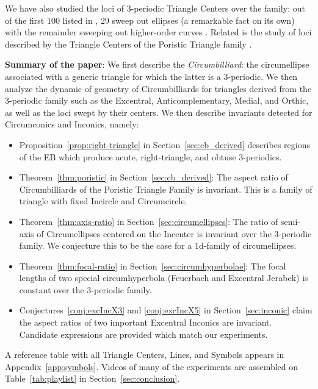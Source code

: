 We have also studied the loci of 3-periodic Triangle Centers over the family: out of the first 100 listed in \cite{etc}, 29 sweep out ellipses (a remarkable fact on its own) with the remainder sweeping out higher-order curves \cite{garcia2020-ellipses}. Related is the study of  loci described by the Triangle Centers of the Poristic Triangle family \cite{odehnal2011-poristic}.

\textbf{Summary of the paper}: We first describe the {\em Circumbilliard}: the circumellipse associated with a generic triangle for which the latter is a 3-periodic. We then analyze the dynamic of geometry of Circumbilliards for triangles derived from the 3-periodic family such as the Excentral, Anticomplementary, Medial, and Orthic, as well as the loci swept by their centers. We then describe invariants detected for Circumconics and Inconics, namely:

\begin{itemize}
\item Proposition~\ref{prop:right-triangle} in Section~\ref{sec:cb_derived} describes regions of the EB which produce acute, right-triangle, and obtuse 3-periodics. 
\item Theorem~\ref{thm:poristic} in Section~\ref{sec:cb_derived}: The aspect ratio of Circumbilliards of the Poristic Triangle Family \cite{gallatly1914-geometry} is invariant. This is a family of triangle with fixed Incircle and Circumcircle.
    \item Theorem~\ref{thm:axis-ratio} in Section~\ref{sec:circumellipses}: The ratio of semi-axis of Circumellipses centered on the Incenter is invariant over the 3-periodic family. We conjecture this to be the case for a 1d-family of circumellipses.
    \item Theorem~\ref{thm:focal-ratio} in Section~\ref{sec:circumhyperbolae}: The focal lengths of two special circumhyperbola (Feuerbach and Excentral Jerabek) is constant over the 3-periodic family.
    \item Conjectures~\ref{conj:excIncX3} and \ref{conj:excIncX5} in Section~\ref{sec:inconic} claim the aspect ratios of two important Excentral Inconics are invariant. Candidate expressions are provided which match our experiments.
\end{itemize}

A reference table with all Triangle Centers, Lines, and Symbols appears in Appendix~\ref{app:symbols}. Videos of many of the experiments are assembled on Table~\ref{tab:playlist} in Section~\ref{sec:conclusion}.



